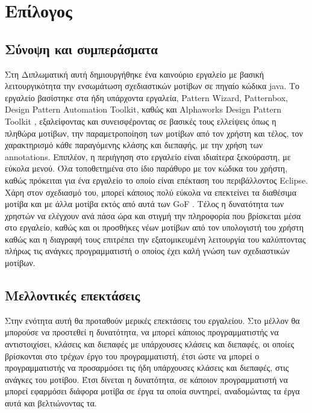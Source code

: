 \chapter{Επίλογος}
\label{chepilogue}
\section{Σύνοψη και συμπεράσματα}
\label{secconclusion}
Στη Διπλωματική αυτή δημιουργήθηκε ένα καινούριο εργαλείο 
με βασική λειτουργικότητα την ενσωμάτωση σχεδιαστικών μοτίβων σε πηγαίο κώδικα java. 
Το εργαλείο βασίστηκε στα ήδη υπάρχοντα εργαλεία, Pattern Wizard, Patternbox, Design Pattern Automation Toolkit, καθώς και 
Alphaworks Design Pattern Toolkit \cite{PatternBox}, εξαλείφοντας  και συνεισφέροντας  σε βασικές 
τους ελλείψεις όπως η πληθώρα μοτίβων, την παραμετροποίηση των μοτίβων από τον χρήστη και τέλος, τον χαρακτηρισμό 
κάθε παραγόμενης κλάσης και διεπαφής, με την χρήση των annotations. Επιπλέον, η περιήγηση στο εργαλείο είναι ιδιαίτερα ξεκούραστη, 
με εύκολα μενού. Όλα τοποθετημένα στο ίδιο παράθυρο με τον κώδικα του χρήστη, καθώς πρόκειται για ένα εργαλείο το οποίο 
είναι επέκταση του περιβάλλοντος Eclipse.
Χάρη στον σχεδιασμό του, μπορεί κάποιος πολύ εύκολα να επεκτείνει τα διαθέσιμα μοτίβα 
και με άλλα μοτίβα εκτός από αυτά των GoF \cite{GoF}. Τέλος η δυνατότητα των χρηστών να ελέγχουν ανά πάσα ώρα και στιγμή 
την πληροφορία που βρίσκεται μέσα στο εργαλείο, καθώς και οι προσθήκες  νέων μοτίβων από τον υπολογιστή του χρήστη καθώς 
και η διαγραφή τους επιτρέπει την εξατομικευμένη λειτουργία του καλύπτοντας πλήρως τις ανάγκες 
προγραμματιστή ο οποίος έχει καλή γνώση των σχεδιαστικών μοτίβων.
\section{Μελλοντικές επεκτάσεις}
\label{secfeatures}
Στην ενότητα αυτή θα προταθούν μερικές επεκτάσεις του εργαλείου. Στο μέλλον θα μπορούσε να προστεθεί η δυνατότητα, 
να μπορεί κάποιος προγραμματιστής να αντιστοιχίσει, κλάσεις και διεπαφές με υπάρχουσες κλάσεις και διεπαφές, 
οι οποίες βρίσκονται στο τρέχων έργο του προγραμματιστή, έτσι ώστε να μπορεί ο προγραμματιστής να προσαρμόσει 
τις ήδη υπάρχουσες κλάσεις και διεπαφές, στις ανάγκες του μοτίβου. Έτσι δίνεται η δυνατότητα, 
σε κάποιον προγραμματιστή να μπορεί εφαρμόσει διάφορα μοτίβα σε έργα τα οποία συντηρεί, 
αναδομώντας τα έργα αυτά και βελτιώνοντας τα.
